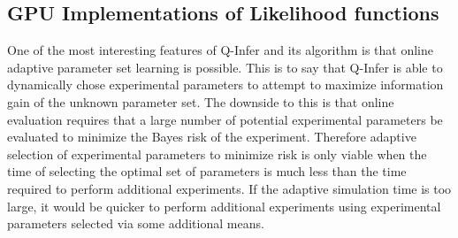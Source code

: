 \subsection{GPU Implementations of Likelihood functions}
One of the most interesting features of Q-Infer and its algorithm is that online adaptive parameter set learning is possible. This is to say that Q-Infer is able to dynamically chose experimental parameters to attempt to maximize information gain of the unknown parameter set. The downside to this is that online evaluation requires that a large number of potential experimental parameters be evaluated to minimize the Bayes risk of the experiment. Therefore adaptive selection of experimental parameters to minimize risk is only viable when the time of selecting the optimal set of parameters is much less than the time required to perform additional experiments. If the adaptive simulation time is too large, it would be quicker to perform additional experiments using experimental parameters selected via some additional means.

